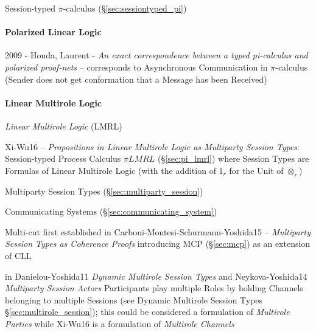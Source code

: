 Session-typed $\pi$-calculus (\S\ref{sec:sessiontyped_pi})



\paragraph{Polarized Linear Logic}\label{sec:polarized_linear_logic}\hfill

2009 - Honda, Laurent - \emph{An exact correspondence between a typed
  pi-calculus and polarized proof-nets} -- corresponds to Asynchronous
Communication in $\pi$-calculus (Sender does not get conformation that a
Message has been Received)



\paragraph{Linear Multirole Logic}\label{sec:lmrl}\hfill

\begingroup

\newcommand{\msg}{\mathtt{msg}}
\newcommand{\nil}{\mathtt{nil}}

\newcommand{\channelsend}{\mathtt{channel\_send}}
\newcommand{\channelrecv}{\mathtt{channel\_recv}}
\newcommand{\channelclose}{\mathtt{channel\_close}}
\newcommand{\channelskip}{\mathtt{channel\_skip}}

\newcommand{\Chan}{\mathsf{Chan}}
\newcommand{\Int}{\mathsf{Int}}
\renewcommand{\Unit}{\mathsf{()}}

\emph{Linear Multirole Logic} (LMRL)

Xi-Wu16 -- \emph{Propositions in Linear Multirole Logic as Multiparty
  Session Types}: Session-typed Process Calculus $\pi LMRL$
(\S\ref{sec:pi_lmrl}) where Session Types are Formulas of Linear
Multirole Logic (with the addition of $1_r$ for the Unit of
$\otimes_r$)

\fist Multiparty Session Types (\S\ref{sec:multiparty_session})

\fist Communicating Systems (\S\ref{sec:communicating_system})

Multi-cut first established in Carboni-Montesi-Schurmann-Yoshida15 --
\emph{Multiparty Session Types as Coherence Proofs} introducing MCP
(\S\ref{sec:mcp}) as an extension of CLL

\fist in Danielou-Yoshida11 \emph{Dynamic Multirole Session Types} and
Neykova-Yoshida14 \emph{Multiparty Session Actors} Participants play
multiple Roles by holding Channels belonging to multiple Sessions (see
Dynamic Multirole Session Types \S\ref{sec:multirole_session}); this
could be considered a formulation of \emph{Multirole Parties} while
Xi-Wu16 is a formulation of \emph{Multirole Channels}


